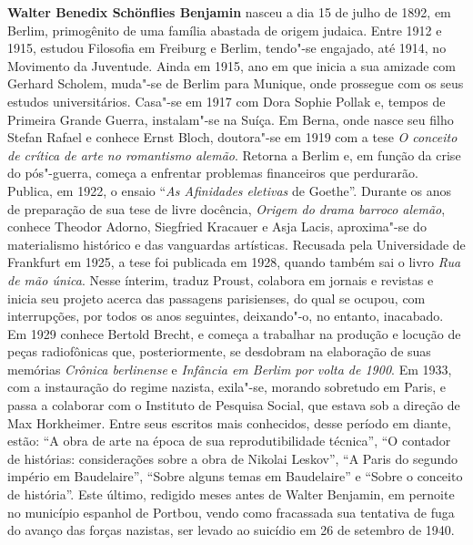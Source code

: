 
\textbf{Walter Benedix Schönflies Benjamin} nasceu a dia 15 de julho de 1892, em Berlim,
primogênito de uma família abastada de origem judaica. Entre 1912 e 1915, estudou Filosofia
em Freiburg e Berlim, tendo"-se engajado, até 1914, no Movimento da Juventude. Ainda em
1915, ano em que inicia a sua amizade com Gerhard Scholem, muda"-se de Berlim para
Munique, onde prossegue com os seus estudos universitários. Casa"-se em 1917 com Dora
Sophie Pollak e, tempos de Primeira Grande Guerra, instalam"-se na Suíça. Em Berna, onde nasce seu filho Stefan
Rafael e conhece Ernst Bloch, doutora"-se em 1919 com a tese \emph{O conceito de crítica de
arte no romantismo alemão}. Retorna a Berlim e, em função da crise do pós"-guerra, começa a
enfrentar problemas financeiros que perdurarão. Publica, em 1922, o ensaio ``\emph{As Afinidades
eletivas} de Goethe''. Durante os anos de preparação de sua tese de livre docência, \emph{Origem do
drama barroco alemão}, conhece Theodor Adorno, Siegfried Kracauer e Asja Lacis, aproxima"-se do materialismo histórico e das vanguardas artísticas. Recusada pela Universidade de
Frankfurt em 1925, a tese foi publicada em 1928, quando também sai o livro \emph{Rua de mão única}.
Nesse ínterim, traduz Proust, colabora em jornais e revistas e inicia seu projeto acerca das
passagens parisienses, do qual se ocupou, com interrupções, por todos os anos seguintes,
deixando"-o, no entanto, inacabado. Em 1929 conhece Bertold Brecht, e começa a trabalhar na
produção e locução de peças radiofônicas que, posteriormente, se desdobram na elaboração de
suas memórias \emph{Crônica berlinense} e \emph{Infância em Berlim por volta de 1900}. Em 1933, com a
instauração do regime nazista, exila"-se, morando sobretudo em Paris, e passa a colaborar com o
Instituto de Pesquisa Social, que estava sob a direção de Max Horkheimer. Entre seus escritos
mais conhecidos, desse período em diante, estão: ``A obra de arte na época de sua
reprodutibilidade técnica'', ``O contador de histórias: considerações sobre a obra de Nikolai
Leskov'', ``A Paris do segundo império em Baudelaire'', ``Sobre alguns temas em Baudelaire'' e
``Sobre o conceito de história''. Este último, redigido meses antes de Walter Benjamin, em
pernoite no município espanhol de Portbou, vendo como fracassada sua tentativa de fuga do
avanço das forças nazistas, ser levado ao suicídio em 26 de setembro de 1940.



